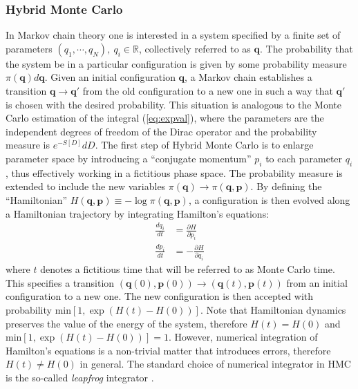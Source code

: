 \subsubsection{Hybrid Monte Carlo}
In Markov chain theory one is interested in a system specified by a finite set of parameters $(q_1, \cdots, q_N), \ q_i \in \mathbb{R}$, collectively referred to as $\mathbf{q}$. The probability that the system be in a particular configuration is given by some probability measure $\pi (\mathbf{q}) d\mathbf{q}$. Given an initial configuration $\mathbf{q}$, a Markov chain establishes a transition $\mathbf{q} \rightarrow \mathbf{q}'$ from the old configuration to a new one in such a way that $\mathbf{q}'$ is chosen with the desired probability.\newline 
This situation is analogous to the Monte Carlo estimation of the integral (\ref{eq:expval}), where the parameters are the independent degrees of freedom of the Dirac operator and the probability measure is $e^{-S[D]}dD$.\newline
The first step of Hybrid Monte Carlo is to enlarge parameter space by introducing a ``conjugate momentum'' $p_i$ to each parameter $q_i$, thus effectively working in a fictitious phase space. The probability measure is extended to include the new variables $\pi (\mathbf{q}) \rightarrow \pi (\mathbf{q}, \mathbf{p})$. By defining the ``Hamiltonian'' $H(\mathbf{q}, \mathbf{p}) \equiv -\log \pi (\mathbf{q}, \mathbf{p})$, a configuration is then evolved along a Hamiltonian trajectory by integrating Hamilton's equations:
\begin{align}
\frac{dq_i}{dt} &= \frac{\partial{H}}{\partial{p_i}} \label{eq:dqdt} \\
\frac{dp_i}{dt} &= -\frac{\partial{H}}{\partial{q_i}} \label{eq:dpdt}
\end{align}
where $t$ denotes a fictitious time that will be referred to as Monte Carlo time. This specifies a transition $(\mathbf{q}(0), \mathbf{p}(0)) \rightarrow (\mathbf{q}(t), \mathbf{p}(t))$ from an initial configuration to a new one. The new configuration is then accepted with probability $\text{min}[1, \exp (H(t)-H(0))]$. \newline
Note that Hamiltonian dynamics preserves the value of the energy of the system, therefore $H(t) = H(0)$ and $\text{min}[1, \exp (H(t)-H(0))] = 1$. However, numerical integration of Hamilton's equations is a non-trivial matter that introduces errors, therefore $H(t) \neq H(0)$ in general. The standard choice of numerical integrator in HMC is the so-called \textit{leapfrog} integrator \cite{neal} \cite{betan}.

